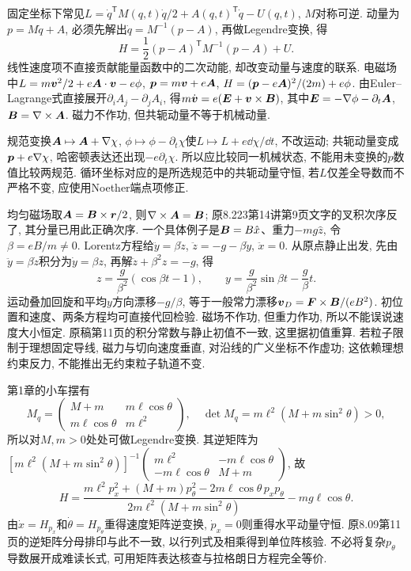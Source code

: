 固定坐标下常见$L=\dot q^{\mathsf T}M(q,t)\dot q/2+A(q,t)^{\mathsf T}\dot q-U(q,t)$, $M$对称可逆. 动量为$p=M\dot q+A$, 必须先解出$\dot q=M^{-1}(p-A)$, 再做Legendre变换, 得
\[
H=\frac12(p-A)^{\mathsf T}M^{-1}(p-A)+U.
\]
线性速度项不直接贡献能量函数中的二次动能, 却改变动量与速度的联系. 电磁场中$L=m\boldsymbol{v}^2/2+e\boldsymbol{A}\cdot\boldsymbol{v}-e\phi$, $\boldsymbol{p}=m\boldsymbol{v}+e\boldsymbol{A}$, $H=(\boldsymbol{p}-e\boldsymbol{A})^2/(2m)+e\phi$. 由Euler--Lagrange式直接展开$\partial_iA_j-\partial_jA_i$, 得$m\dot{\boldsymbol{v}}=e(\boldsymbol{E}+\boldsymbol{v}\times\boldsymbol{B})$, 其中$\boldsymbol{E}=-\nabla\phi-\partial_t\boldsymbol{A}$, $\boldsymbol{B}=\nabla\times\boldsymbol{A}$. 磁力不作功, 但共轭动量不等于机械动量.

规范变换$\boldsymbol{A}\mapsto\boldsymbol{A}+\nabla\chi$, $\phi\mapsto\phi-\partial_t\chi$使$L\mapsto L+e\dd\chi/\dd t$, 不改运动; 共轭动量变成$\boldsymbol{p}+e\nabla\chi$, 哈密顿表达还出现$-e\partial_t\chi$. 所以应比较同一机械状态, 不能用未变换的$p$数值比较两规范. 循环坐标对应的是所选规范中的共轭动量守恒, 若$L$仅差全导数而不严格不变, 应使用Noether端点项修正.

均匀磁场取$\boldsymbol{A}=\boldsymbol{B}\times\boldsymbol{r}/2$, 则$\nabla\times\boldsymbol{A}=\boldsymbol{B}$; 原8.223第14讲第9页文字的叉积次序反了, 其分量已用此正确次序. 一个具体例子是$\boldsymbol{B}=B\hat x$、重力$-mg\hat z$, 令$\beta=eB/m\ne0$. Lorentz方程给$\ddot y=\beta\dot z$, $\ddot z=-g-\beta\dot y$, $\ddot x=0$. 从原点静止出发, 先由$\ddot y=\beta\dot z$积分为$\dot y=\beta z$, 再解$\ddot z+\beta^2z=-g$, 得
\[
z=\frac g{\beta^2}(\cos\beta t-1),\qquad
y=\frac g{\beta^2}\sin\beta t-\frac g\beta t.
\]
运动叠加回旋和平均$y$方向漂移$-g/\beta$, 等于一般常力漂移$\boldsymbol{v}_D=\boldsymbol{F}\times\boldsymbol{B}/(eB^2)$. 初位置和速度、两条方程均可直接代回检验. 磁场不作功, 但重力作功, 所以不能误说速度大小恒定. 原稿第11页的积分常数与静止初值不一致, 这里据初值重算. 若粒子限制于理想固定导线, 磁力与切向速度垂直, 对沿线的广义坐标不作虚功; 这依赖理想约束反力, 不能推出无约束粒子轨道不变.

第1章的小车摆有
\[
M_q=\begin{pmatrix}M+m&m\ell\cos\theta\\m\ell\cos\theta&m\ell^2\end{pmatrix},
\quad \det M_q=m\ell^2(M+m\sin^2\theta)>0,
\]
所以对$M,m>0$处处可做Legendre变换. 其逆矩阵为$[m\ell^2(M+m\sin^2\theta)]^{-1}\left(\begin{smallmatrix}m\ell^2&-m\ell\cos\theta\\-m\ell\cos\theta&M+m\end{smallmatrix}\right)$, 故
\[
H=\frac{m\ell^2p_x^2+(M+m)p_\theta^2-2m\ell\cos\theta\,p_xp_\theta}
{2m\ell^2(M+m\sin^2\theta)}-mg\ell\cos\theta.
\]
由$\dot x=H_{p_x}$和$\dot\theta=H_{p_\theta}$重得速度矩阵逆变换, $\dot p_x=0$则重得水平动量守恒. 原8.09第11页的逆矩阵分母排印与此不一致, 以行列式及相乘得到单位阵核验. 不必将复杂$p_\theta$导数展开成难读长式, 可用矩阵表达核查与拉格朗日方程完全等价.

